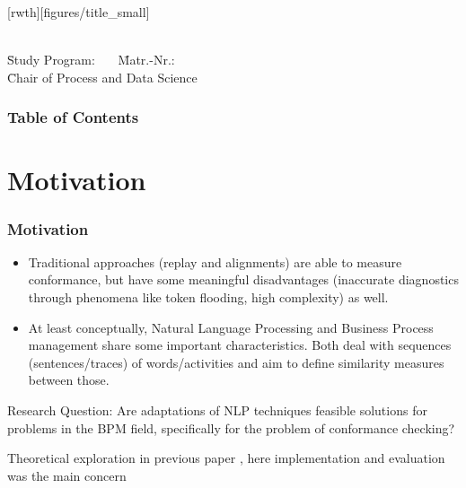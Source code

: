 \documentclass{beamer}
\author[\firstname]{\firstname~\lastname~\email}
\institute[RWTH]{RWTH Aachen University}
\begin{document}
	\beamertemplatenavigationsymbolsempty
[rwth][figures/title_small]{}
\begin{frame}[plain]
	\vspace{1cm}
	\titlepage
	
	\vspace{-6em}
	\parbox{0cm}{
		\begin{tabbing}
			\=\textbf{\firstname~\lastname}\=\\[0.4em]
			\=Study Program: \studyProgram~~~\=Matr.-Nr.:\matrNo\\[0.4em]
			\=Chair of Process and Data Science \=\\%
		\end{tabbing}
	}
\end{frame}
	\begin{frame}
		\frametitle{Table of Contents}
		\tableofcontents
	\end{frame}
	\section{Motivation}
	\begin{frame}
		\frametitle{Motivation}
		\begin{itemize}
			\item Traditional approaches (replay and alignments) are able to measure conformance, but have some meaningful disadvantages (inaccurate diagnostics through phenomena like token flooding, high complexity) as well.
			\item At least conceptually, Natural Language Processing and Business Process management share some important characteristics. Both deal with sequences (sentences/traces) of words/activities and aim to define similarity measures between those.
		\end{itemize}
		\begin{block}{Research Question:}
			Are adaptations of NLP techniques feasible solutions for problems in the BPM field, specifically for the problem of conformance checking?
		\end{block}
		\alert{Theoretical exploration in previous paper \cite{KBWe18}, here \cite{PBWe20} implementation and evaluation was the main concern}
	\end{frame}
\end{document}
